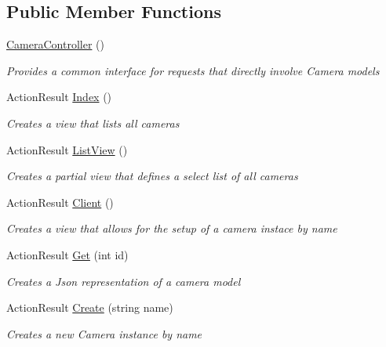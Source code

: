 \subsection*{Public Member Functions}
\begin{DoxyCompactItemize}
\item 
\mbox{\hyperlink{class_eagle_eye_1_1_controllers_1_1_camera_controller_a6b73ce65988171c22a039de9de4ac2c0}{Camera\+Controller}} ()
\begin{DoxyCompactList}\small\item\em Provides a common interface for requests that directly involve Camera models \end{DoxyCompactList}\item 
Action\+Result \mbox{\hyperlink{class_eagle_eye_1_1_controllers_1_1_camera_controller_aef90502fd5923368a7ef1773280e4b32}{Index}} ()
\begin{DoxyCompactList}\small\item\em Creates a view that lists all cameras \end{DoxyCompactList}\item 
Action\+Result \mbox{\hyperlink{class_eagle_eye_1_1_controllers_1_1_camera_controller_ae60e0235e0f741b4e102a7d1df22eed1}{List\+View}} ()
\begin{DoxyCompactList}\small\item\em Creates a partial view that defines a select list of all cameras \end{DoxyCompactList}\item 
Action\+Result \mbox{\hyperlink{class_eagle_eye_1_1_controllers_1_1_camera_controller_a22c71acb769ab89d66c816e8af2dd55e}{Client}} ()
\begin{DoxyCompactList}\small\item\em Creates a view that allows for the setup of a camera instace by name \end{DoxyCompactList}\item 
Action\+Result \mbox{\hyperlink{class_eagle_eye_1_1_controllers_1_1_camera_controller_a6dfc692f61939468dffcf13b5899ed5f}{Get}} (int id)
\begin{DoxyCompactList}\small\item\em Creates a Json representation of a camera model \end{DoxyCompactList}\item 
Action\+Result \mbox{\hyperlink{class_eagle_eye_1_1_controllers_1_1_camera_controller_a07c68e0e159c17b1725489ddf54f9f1d}{Create}} (string name)
\begin{DoxyCompactList}\small\item\em Creates a new Camera instance by name \end{DoxyCompactList}\item 

\end{DoxyCompactItemize}
